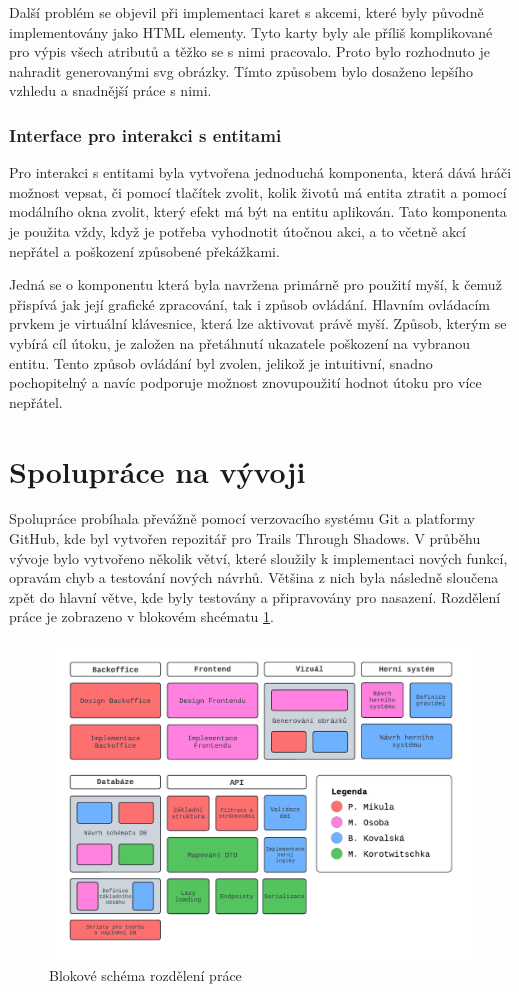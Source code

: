 Další problém se objevil při implementaci karet s akcemi, které byly původně implementovány jako HTML elementy. Tyto karty byly ale příliš komplikované pro výpis všech atributů a těžko se s nimi pracovalo. Proto bylo rozhodnuto je nahradit generovanými svg obrázky. Tímto způsobem bylo dosaženo lepšího vzhledu a snadnější práce s nimi.

\subsubsection*{Interface pro interakci s entitami}
Pro interakci s entitami byla vytvořena jednoduchá komponenta, která dává hráči možnost vepsat, či pomocí tlačítek zvolit, kolik životů má entita ztratit a pomocí modálního okna zvolit, který efekt má být na entitu aplikován. Tato komponenta je použita vždy, když je potřeba vyhodnotit útočnou akci, a to včetně akcí nepřátel a poškození způsobené překážkami.

Jedná se o komponentu která byla navržena primárně pro použití myší, k čemuž přispívá jak její grafické zpracování, tak i způsob ovládání. Hlavním ovládacím prvkem je virtuální klávesnice, která lze aktivovat právě myší. Způsob, kterým se vybírá cíl útoku, je založen na přetáhnutí ukazatele poškození na vybranou entitu. Tento způsob ovládání byl zvolen, jelikož je intuitivní, snadno pochopitelný a navíc podporuje možnost znovupoužití hodnot útoku pro více nepřátel.

\section{Spolupráce na vývoji}
Spolupráce probíhala převážně pomocí verzovacího systému Git a platformy GitHub, kde byl vytvořen repozitář pro Trails Through Shadows. V průběhu vývoje bylo vytvořeno několik větví, které sloužily k implementaci nových funkcí, opravám chyb a testování nových návrhů. Většina z nich byla následně sloučena zpět do hlavní větve, kde byly testovány a připravovány pro nasazení. Rozdělení práce je zobrazeno v blokovém shcématu \ref{fig:workflow}.

\begin{figure}[H]
  \centering
  \includegraphics[width=.95\textwidth]{../../shared/diagrams/blocks.pdf}
  \caption{Blokové schéma rozdělení práce}
  \label{fig:workflow}
\end{figure}

